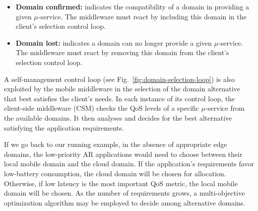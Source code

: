 \begin{itemize}
	
	\item \textbf{Domain confirmed:} indicates the compatibility of a domain in providing a given $\mu$-service. The middleware must react by including this domain in the client's selection control loop.	
	
	\item \textbf{Domain lost:} indicates a domain can no longer provide a given $\mu$-service. The middleware must react by removing this domain from the client's selection control loop.
	
\end{itemize}

A self-management control loop (see Fig.~\ref{fig:domain-selection-loop}) is also exploited by the mobile middleware in the selection of the domain alternative that best satisfies the client's needs. In each instance of its control loop, the client-side middleware (CSM) checks the QoS levels of a specific $\mu$-service from the available domains. It then analyses and decides for the best alternative satisfying the application requirements.




If we go back to our running example, in the absence of appropriate edge domains, the low-priority AR applications would need to choose between their local mobile domain and the cloud domain. If the application's requirements favor low-battery consumption, the cloud domain will be chosen for allocation. Otherwise, if low latency is the most important QoS metric, the local mobile domain will be chosen. As the number of requirements grows, a multi-objective optimization algorithm may be employed to decide among alternative domains.


